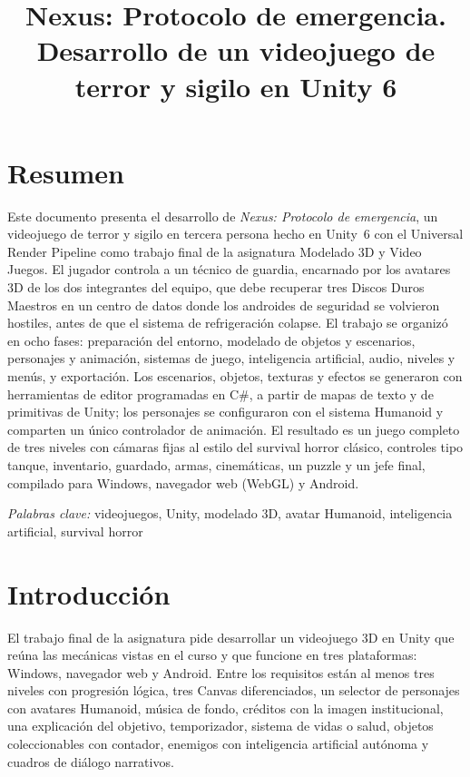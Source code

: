\documentclass[stu,letterpaper,12pt,donotrepeattitle,floatsintext]{apa7}
\title{Nexus: Protocolo de emergencia. Desarrollo de un videojuego de terror y sigilo en Unity 6}
\begin{document}
\maketitle

\renewcommand{\contentsname}{Tabla de contenido}
\tableofcontents
\clearpage

\section*{Resumen}

Este documento presenta el desarrollo de \textit{Nexus: Protocolo de emergencia}, un videojuego de
terror y sigilo en tercera persona hecho en Unity~6 con el Universal Render Pipeline como trabajo
final de la asignatura Modelado 3D y Video Juegos. El jugador controla a un técnico de guardia,
encarnado por los avatares 3D de los dos integrantes del equipo, que debe recuperar tres Discos
Duros Maestros en un centro de datos donde los androides de seguridad se volvieron hostiles, antes
de que el sistema de refrigeración colapse. El trabajo se organizó en ocho fases: preparación del
entorno, modelado de objetos y escenarios, personajes y animación, sistemas de juego, inteligencia
artificial, audio, niveles y menús, y exportación. Los escenarios, objetos, texturas y efectos se
generaron con herramientas de editor programadas en C\#, a partir de mapas de texto y de primitivas
de Unity; los personajes se configuraron con el sistema Humanoid y comparten un único controlador
de animación. El resultado es un juego completo de tres niveles con cámaras fijas al estilo del
survival horror clásico, controles tipo tanque, inventario, guardado, armas, cinemáticas, un puzzle
y un jefe final, compilado para Windows, navegador web (WebGL) y Android.

\textit{Palabras clave:} videojuegos, Unity, modelado 3D, avatar Humanoid, inteligencia artificial,
survival horror
\clearpage

\section{Introducción}

El trabajo final de la asignatura pide desarrollar un videojuego 3D en Unity que reúna las mecánicas
vistas en el curso y que funcione en tres plataformas: Windows, navegador web y Android. Entre los
requisitos están al menos tres niveles con progresión lógica, tres Canvas diferenciados, un selector
de personajes con avatares Humanoid, música de fondo, créditos con la imagen institucional, una
explicación del objetivo, temporizador, sistema de vidas o salud, objetos coleccionables con
contador, enemigos con inteligencia artificial autónoma y cuadros de diálogo narrativos.
\end{document}
